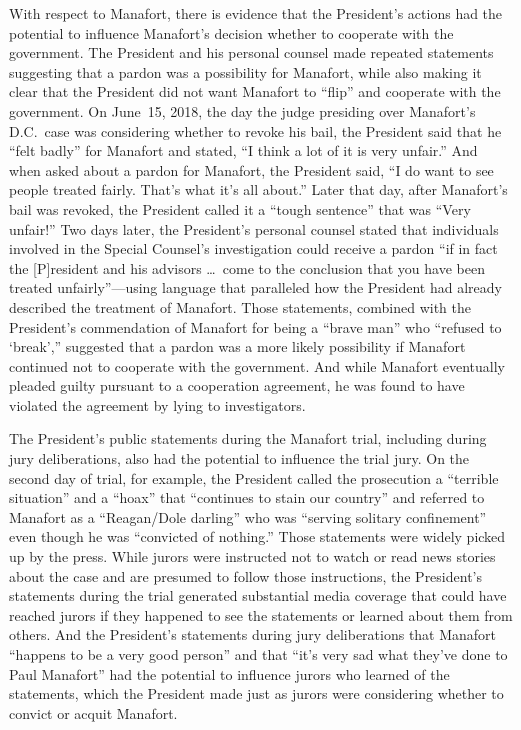 With respect to Manafort, there is evidence that the President's actions had the potential to influence Manafort's decision whether to cooperate with the government.
The President and his personal counsel made repeated statements suggesting that a pardon was a possibility for Manafort, while also making it clear that the President did not want Manafort to ``flip'' and cooperate with the government.
On June~15, 2018, the day the judge presiding over Manafort's D.C.~case was considering whether to revoke his bail, the President said that he ``felt badly'' for Manafort and stated, ``I think a lot of it is very unfair.''
And when asked about a pardon for Manafort, the President said, ``I do want to see people treated fairly.
That's what it's all about.'' Later that day, after Manafort's bail was revoked, the President called it a ``tough sentence'' that was ``Very unfair!''
Two days later, the President's personal counsel stated that individuals involved in the Special Counsel's investigation could receive a pardon ``if in fact the [P]resident and his advisors \dots\ come to the conclusion that you have been treated unfairly''---using language that paralleled how the President had already described the treatment of Manafort.
Those statements, combined with the President's commendation of Manafort for being a ``brave man'' who ``refused to `break','' suggested that a pardon was a more likely possibility if Manafort continued not to cooperate with the government.
And while Manafort eventually pleaded guilty pursuant to a cooperation agreement, he was found to have violated the agreement by lying to investigators.

The President's public statements during the Manafort trial, including during jury deliberations, also had the potential to influence the trial jury.
On the second day of trial, for example, the President called the prosecution a ``terrible situation'' and a ``hoax'' that ``continues to stain our country'' and referred to Manafort as a ``Reagan/Dole darling'' who was ``serving solitary confinement'' even though he was ``convicted of nothing.''
Those statements were widely picked up by the press.
While jurors were instructed not to watch or read news stories about the case and are presumed to follow those instructions, the President's statements during the trial generated substantial media coverage that could have reached jurors if they happened to see the statements or learned about them from others.
And the President's statements during jury deliberations that Manafort ``happens to be a very good person'' and that ``it's very sad what they've done to Paul Manafort'' had the potential to influence jurors who learned of the statements, which the President made just as jurors were considering whether to convict or acquit Manafort.

